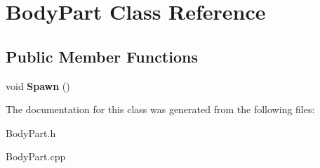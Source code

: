 \hypertarget{class_body_part}{}\section{Body\+Part Class Reference}
\label{class_body_part}
\subsection*{Public Member Functions}
\begin{DoxyCompactItemize}
\item 
\hypertarget{class_body_part_afb8155ab202d20a855df83883a25b7c8}{}void {\bfseries Spawn} ()\label{class_body_part_afb8155ab202d20a855df83883a25b7c8}

\end{DoxyCompactItemize}


The documentation for this class was generated from the following files\+:\begin{DoxyCompactItemize}
\item 
Body\+Part.\+h\item 
Body\+Part.\+cpp\end{DoxyCompactItemize}
